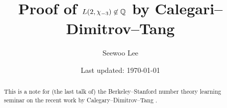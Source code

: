 \documentclass[letterpaper, 12pt]{article}
\begin{document}

\title{Proof of $L(2, \chi_{-3}) \not \in \mathbb{Q}$ by Calegari--Dimitrov--Tang}


\author{Seewoo Lee}
\date{\normalsize\vspace{-1ex} Last updated: \today}


\maketitle



\begin{abstract}
This is a note for (the last talk of) the Berkeley--Stanford number theory learning seminar on the recent work by Calegary--Dimitrov--Tang \cite{calegari2024linear}.
\end{abstract}

% 







\newpage










\end{document}
